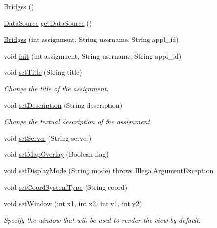 \begin{DoxyCompactItemize}
\item 
\mbox{\hyperlink{classbridges_1_1connect_1_1_bridges_a42f0592841a829f93453506c78951b1f}{Bridges}} ()
\item 
\mbox{\hyperlink{classbridges_1_1connect_1_1_data_source}{Data\+Source}} \mbox{\hyperlink{classbridges_1_1connect_1_1_bridges_acfe00a832969a77504d9d33d783c4fcd}{get\+Data\+Source}} ()
\item 
\mbox{\hyperlink{classbridges_1_1connect_1_1_bridges_a4c47eb7cbb94c5810dc38c38760db872}{Bridges}} (int assignment, String username, String appl\+\_\+id)
\item 
void \mbox{\hyperlink{classbridges_1_1connect_1_1_bridges_a87aa73367a43cfc8b3ae5e4926ea4895}{init}} (int assignment, String username, String appl\+\_\+id)
\item 
void \mbox{\hyperlink{classbridges_1_1connect_1_1_bridges_aed3752ee6318a48dff271d9a9e2a8fcc}{set\+Title}} (String title)
\begin{DoxyCompactList}\small\item\em Change the title of the assignment. \end{DoxyCompactList}\item 
void \mbox{\hyperlink{classbridges_1_1connect_1_1_bridges_a50d1d5aa64d312393b63d1be854e34a2}{set\+Description}} (String description)
\begin{DoxyCompactList}\small\item\em Change the textual description of the assignment. \end{DoxyCompactList}\item 
void \mbox{\hyperlink{classbridges_1_1connect_1_1_bridges_ab43e412448e1dfc340e58c407519a576}{set\+Server}} (String server)
\item 
void \mbox{\hyperlink{classbridges_1_1connect_1_1_bridges_a4af383ba2f114ad7bd4e08eb44096973}{set\+Map\+Overlay}} (Boolean flag)
\item 
void \mbox{\hyperlink{classbridges_1_1connect_1_1_bridges_aaa1a44a689daa26a841d0e8d31839861}{set\+Display\+Mode}} (String mode)  throws Illegal\+Argument\+Exception 
\item 
void \mbox{\hyperlink{classbridges_1_1connect_1_1_bridges_ade4a9c43e2b608e6b3dc774b73f95749}{set\+Coord\+System\+Type}} (String coord)
\item 
void \mbox{\hyperlink{classbridges_1_1connect_1_1_bridges_ac2f9a8d7852e499a7ed3521f06d470bf}{set\+Window}} (int x1, int x2, int y1, int y2)
\begin{DoxyCompactList}\small\item\em Specify the window that will be used to render the view by default. \end{DoxyCompactList}\item 

\end{DoxyCompactItemize}
